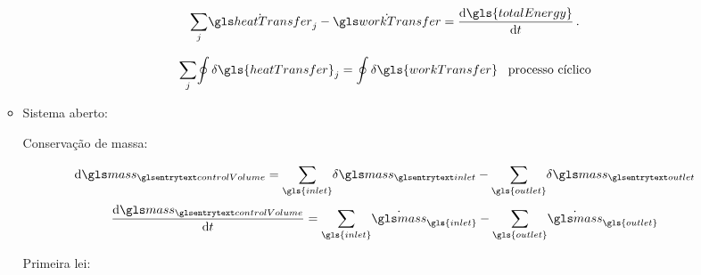 \begin{enumerate}
\begin{itemize}
                \begin{equation*}
                    \underset{j}{\sum }{%
                        \transferRate{heatTransfer}_j
                    }
                    -
                    \transferRate{workTransfer}
                    =
                    \DDt{\gls{totalEnergy}}\,.
                \end{equation*}

                \begin{equation*}
                    \underset{j}{\sum }{
                        \oint{
                            \idiff{\gls{heatTransfer}}_j
                        }
                    }
                    =
                    \oint{%
                        \idiff{\gls{workTransfer}}
                    }\,
                    \,\,\,\,
                    \text{processo cíclico}
                \end{equation*}

            \item Sistema aberto:

                Conservação de massa:

                \begin{equation*} \label{eq:massConvservationForms}
                    \diff{\gsub{mass}{controlVolume}}
                    =
                    \underset{\gls{inlet}}{\sum }{
                        \idiff{\gsub{mass}{inlet}}
                    }
                    -
                    \underset{\gls{outlet}}{\sum }{
                        \idiff{\gsub{mass}{outlet}}
                    }
                \end{equation*}
                \begin{equation*} \label{eq:massConservationRateForms}
                    \DDt{\gsub{mass}{controlVolume}}
                    =
                    \underset{\gls{inlet}}{\sum }{
                        \transferRate{mass}_{\gls{inlet}}
                    }
                    -
                    \underset{\gls{outlet}}{\sum }{
                        \transferRate{mass}_{\gls{outlet}}
                    }
                \end{equation*}

                Primeira lei:


\end{itemize}
\end{enumerate}
